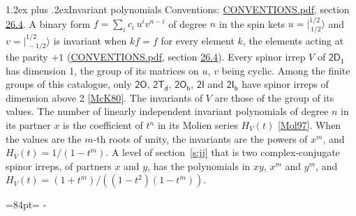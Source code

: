 \documentclass[10pt,a4paper]{article}
\makeatletter
\renewcommand\section{\@startsection{section}{1}{\z@}{-3ex plus -1ex minus -.2ex}%
  {1.2ex plus .2ex}{\normalfont\large\sffamily\bfseries\color{parttitle}}}
\newcommand{\needspace}[1]{\par\penalty-100\begingroup\dimen0=#1\relax\dimen2=\pagegoal
  \advance\dimen2-\pagetotal\ifdim\dimen0>\dimen2\relax\ifdim\dimen2>0pt\vfil\break\fi\fi
  \endgroup}
\numberwithin{equation}{section}
\newcommand{\grp}[1]{\mathsf{#1}}
\newcommand{\jm}[2]{\bigl\lvert{}^{#1}_{\,#2}\bigr\rangle}
\makeatother
\begin{document}
\section{Invariant polynomials}\label{s:invariants}
Conventions: \href{../../CONVENTIONS.pdf}{CONVENTIONS.pdf}, section \href{../../CONVENTIONS.pdf\#conv.26.4}{26.4}.
\leavevmode\label{n:local.binary.form}A binary form $f = \sum_i c_i\, u^i v^{n-i}$ of degree $n$ in the spin kets $u = \jm{1/2}{1/2}$ and $v = \jm{1/2}{-1/2}$ is invariant when $k f = f$ for every element $k$, the elements acting at the parity $+1$ (\href{../../CONVENTIONS.pdf}{CONVENTIONS.pdf}, section \href{../../CONVENTIONS.pdf\#conv.26.4}{26.4}).
\leavevmode\label{n:function.hilbert}Every spinor irrep $V$ of $\grp{2D_{1}}$ has dimension 1, the group of its matrices on $u$, $v$ being cyclic. Among the finite groups of this catalogue, only $\grp{2O}$, $\grp{2T_{d}}$, $\grp{2O_{h}}$, $\grp{2I}$ and $\grp{2I_{h}}$ have spinor irreps of dimension above 2 [\href{../../../REFERENCES.pdf\#ref.McK80}{McK80}]. The invariants of $V$ are those of the group of its values. \label{n:local.partner.x}The number of linearly independent invariant polynomials of degree $n$ in its partner $x$ is the coefficient of $t^n$ in its Molien series $H_V(t)$ [\href{../../../REFERENCES.pdf\#ref.Mol97}{Mol97}]. When the values are the $m$-th roots of unity, the invariants are the powers of $x^{m}$, and $H_V(t) = 1/(1 - t^{m})$. A level of section~\ref{s:jj} that is two complex-conjugate spinor irreps, of partners $x$ and $y$, has the polynomials in $xy$, $x^{m}$ and $y^{m}$, and $H_V(t) = (1 + t^{m})/((1 - t^{2})(1 - t^{m}))$.
\needspace{84pt}
\end{document}
